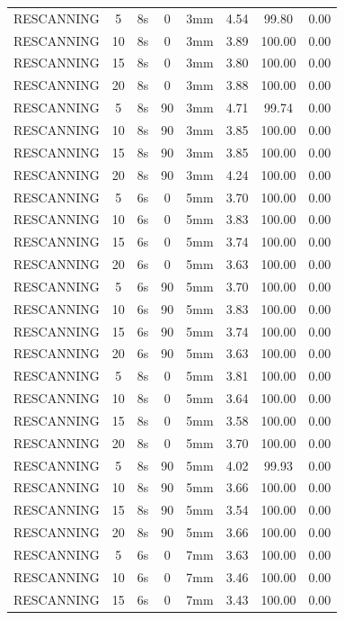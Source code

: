 \documentclass[type=dr, dr=rernat, accentcolor=tud7b,colorbacktitle, bigchapter, openright, twoside, 12pt ]{tudthesis}
\begin{document}
\begin{table}[H]
\begin{tabular}{|c|c||c|c|c||c|c|c|}
RESCANNING & 5 & 8s & 0 & 3mm & 4.54 & 99.80 & 0.00 \\
RESCANNING & 10 & 8s & 0 & 3mm & 3.89 & 100.00 & 0.00 \\
RESCANNING & 15 & 8s & 0 & 3mm & 3.80 & 100.00 & 0.00 \\
RESCANNING & 20 & 8s & 0 & 3mm & 3.88 & 100.00 & 0.00 \\
RESCANNING & 5 & 8s & 90 & 3mm & 4.71 & 99.74 & 0.00 \\
RESCANNING & 10 & 8s & 90 & 3mm & 3.85 & 100.00 & 0.00 \\
RESCANNING & 15 & 8s & 90 & 3mm & 3.85 & 100.00 & 0.00 \\
RESCANNING & 20 & 8s & 90 & 3mm & 4.24 & 100.00 & 0.00 \\
RESCANNING & 5 & 6s & 0 & 5mm & 3.70 & 100.00 & 0.00 \\
RESCANNING & 10 & 6s & 0 & 5mm & 3.83 & 100.00 & 0.00 \\
RESCANNING & 15 & 6s & 0 & 5mm & 3.74 & 100.00 & 0.00 \\
RESCANNING & 20 & 6s & 0 & 5mm & 3.63 & 100.00 & 0.00 \\
RESCANNING & 5 & 6s & 90 & 5mm & 3.70 & 100.00 & 0.00 \\
RESCANNING & 10 & 6s & 90 & 5mm & 3.83 & 100.00 & 0.00 \\
RESCANNING & 15 & 6s & 90 & 5mm & 3.74 & 100.00 & 0.00 \\
RESCANNING & 20 & 6s & 90 & 5mm & 3.63 & 100.00 & 0.00 \\
RESCANNING & 5 & 8s & 0 & 5mm & 3.81 & 100.00 & 0.00 \\
RESCANNING & 10 & 8s & 0 & 5mm & 3.64 & 100.00 & 0.00 \\
RESCANNING & 15 & 8s & 0 & 5mm & 3.58 & 100.00 & 0.00 \\
RESCANNING & 20 & 8s & 0 & 5mm & 3.70 & 100.00 & 0.00 \\
RESCANNING & 5 & 8s & 90 & 5mm & 4.02 & 99.93 & 0.00 \\
RESCANNING & 10 & 8s & 90 & 5mm & 3.66 & 100.00 & 0.00 \\
RESCANNING & 15 & 8s & 90 & 5mm & 3.54 & 100.00 & 0.00 \\
RESCANNING & 20 & 8s & 90 & 5mm & 3.66 & 100.00 & 0.00 \\
RESCANNING & 5 & 6s & 0 & 7mm & 3.63 & 100.00 & 0.00 \\
RESCANNING & 10 & 6s & 0 & 7mm & 3.46 & 100.00 & 0.00 \\
RESCANNING & 15 & 6s & 0 & 7mm & 3.43 & 100.00 & 0.00 \\

\end{tabular}
\end{table}
\end{document}
